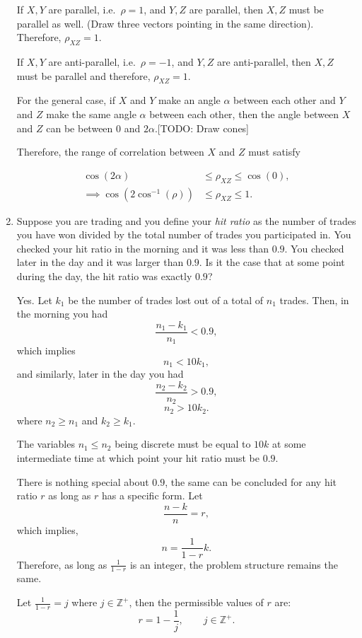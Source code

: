 \documentclass{amsart}
\theoremstyle{plain}
\numberwithin{equation}{section}
\begin{document}
\begin{enumerate}
If $X, Y$ are parallel, i.e.\ $\rho = 1$, and 
$Y, Z$ are parallel, then $X, Z$ must be parallel 
as well. (Draw three vectors pointing in the 
same direction). Therefore, $\rho_{XZ} = 1$.

If $X,Y$ are anti-parallel, i.e.\ $\rho = -1$, and 
$Y, Z$ are anti-parallel, then $X, Z$ must be 
parallel and therefore, $\rho_{XZ}=1$.

For the general case, if $X$ and $Y$ make an angle 
$\alpha$ between each other and $Y$ and $Z$ make the 
same angle $\alpha$ between each other, 
then the angle between $X$ and $Z$ can be between 
$0$ and $2\alpha$.[TODO: Draw cones]

Therefore, the range of correlation between 
$X$ and $Z$ must satisfy

\begin{align*}
\cos\left(2\alpha\right) &\leq \rho_{XZ} \leq \cos\left( 0 \right),\\
\implies \cos\left(2 \cos^{-1} \left(\rho\right) \right) & \leq \rho_{XZ} \leq 1.
\end{align*}

\item Suppose you are trading and you define 
your \emph{hit ratio} as the number of trades you have 
won divided by the total number of trades you 
participated in.
You checked your hit ratio in the morning 
and it was less than $0.9$. You checked later
in the day and it was larger than $0.9$. Is it the 
case that at some point during the day, the hit 
ratio was exactly $0.9$?

Yes. Let $k_1$ be the number of trades lost out of a total of $n_1$
trades. Then, in the morning you had
$$ \frac{n_1-k_1}{n_1} < 0.9,$$
which implies 
$$n_1 < 10k_1,$$ 
and similarly, later in the day you had
$$ \frac{n_2-k_2}{n_2} > 0.9,$$
$$n_2 > 10k_2.$$ 
where $n_2 \geq n_1$ and $k_2\geq k_1$.


The variables $n_1 \leq n_2$ being discrete must be equal 
to $10k$ at some intermediate time at which point 
your hit ratio must be $0.9$.

There is nothing special about $0.9$, the same can 
be concluded for any hit ratio $r$ as long as $r$ has a 
specific form. Let
$$\frac{n-k}{n} = r,$$ which 
implies,
$$ n = \frac{1}{1-r} k.$$
Therefore, as long as $\frac{1}{1-r}$ is an integer,
the problem structure remains the same. 

Let $\frac{1}{1-r} = j$ where $j \in \mathbb{Z^+}$, then
the permissible values of $r$ are:
$$r  = 1 - \frac{1}{j}, \qquad j \in \mathbb{Z^+}.$$


\end{enumerate}
\end{document}
